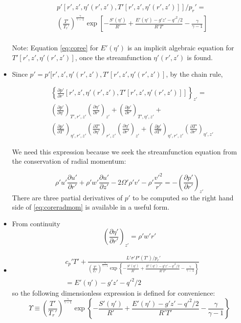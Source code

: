 \documentclass[preprint, prX]{revtex4}
\newcommand{\pfrac}[2]{\left(\frac{#1}{#2}\right)}
\newcommand{\pd}[2]{\frac{\partial#1}{\partial#2}}
\newcommand{\tpd}[3]{\left( \frac{\partial#1}{\partial#2} \right)_{#3}}
\newcommand{\gogmo}{\frac{\gamma}{\gamma-1}}
\begin{document}
\begin{itemize}
\begin{equation}
\begin{split}
&p'\left[r',z',\eta'(r',z'), T'[r',z',\eta'(r',z')] \right]/p_r' =  \\
&\left( \frac{T'}{T_r'}\right)^\gogmo \exp \left[ -\frac{S'(\eta')}{R'}+ \frac{E'(\eta') - g'z' - q'^2/2}{R' T'} - \gogmo	\right] \\
\end{split}
\label{eq:corep}
\end{equation}

Note: Equation \eqref{eq:coree} for $E'(\eta')$ is an implicit algebraic equation for $T'[r',z',\eta'(r',z')]$, once the streamfunction $\eta'(r',z')$ is found.

\item Since $p' = p'[r',z',\eta'(r',z'), T'[r',z',\eta'(r',z')]$, by the chain rule,

\begin{equation}
\begin{split}
&\left \{ \pd{ p'}{ r'} \left[r',z',\eta'(r',z'), T'[r',z',\eta'(r',z')] \right] \right \}_{z'} =\\
& \tpd{ p'}{ \eta'}{T', r', z'}\tpd{ \eta'}{ r'}{z'}+\tpd{ p'}{ r'}{T', \eta', z'}+\\
& \tpd{ p'}{ T'}{\eta', r',z'}\tpd{ T'}{ \eta'}{r',z'}\tpd{ \eta'}{ r'}{z'}+\tpd{ p'}{ T'}{\eta', r',z'} \tpd{ T'}{ r'}{\eta',z'}
\end{split}
\label{eq:pchain}
\end{equation}

We need this expression because we seek the streamfunction equation from the conservation of radial momentum:

\begin{equation}
	\rho'u'\pd{ u'}{ r'} + \rho'w' \pd{ u'}{ z'} - 2 \Omega' \rho'v' - \rho' \frac{v'^2}{r'} = -\tpd{ p'}{ r'}{z'}
	\label{eq:coreradmom}
\end{equation}
There are three partial derivatives of $p'$ to be computed so the right hand side of \eqref{eq:coreradmom} is available in a useful form.

\item From continuity
\begin{equation}
\tpd{ \eta'}{ r'}{z'} = \rho' w' r'
\end{equation}
\item
\begin{equation}
\begin{split}
	&c_p' T' + \frac{L' \sigma' P'(T')/p_r'}{\pfrac{T'}{T_r'}^\gogmo \exp \left\{ -\frac{S'(\eta')}{R'} + \frac{E'(\eta') - g'z' - q'^2/2}{R'T'} - \gogmo \right\}} \\
	& = E'(\eta') - g'z' - q'^2/2
	\end{split}
	\label{eq:coree2}
\end{equation}
so the following dimensionless expression is defined for convenience:
\begin{equation}
\Upsilon \equiv \pfrac{T'}{T_r'}^\gogmo \exp \left\{ -\frac{S'(\eta')}{R'} + \frac{E'(\eta') - g'z' - q'^2/2}{R'T'} - \gogmo \right\}
\end{equation}


\end{itemize}
\end{document}
